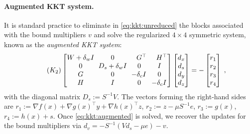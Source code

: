 \documentclass[smallextended]{svjour3}
\begin{document}
\paragraph{Augmented KKT system.}
It is standard practice to eliminate in \eqref{eq:kkt:unreduced} the blocks associated
with the bound multipliers $v$ and solve the regularized
$4 \times 4$ symmetric system, known as the \emph{augmented KKT system}:
\begin{equation}
  \label{eq:kkt:augmented}
  \tag{$K_2$}
  \setlength\arraycolsep{3pt}
  \begin{bmatrix}
    W + \delta_w I & 0   & \phantom{-}G^\top           & \phantom{-}H^\top           \\
      0       & D_s + \delta_w I  & \phantom{-}0\phantom{^\top} & \phantom{-}I\phantom{^\top} \\
      G       & 0   & -\delta_c I  & \phantom{-}0\phantom{^\top} \\
    H       & I   & \phantom{-}0\phantom{^\top} & -\delta_c I
  \end{bmatrix}
  \begin{bmatrix}
    d_x \\
    d_s \\
    d_y \\
    d_z
  \end{bmatrix}
  = - \begin{bmatrix}
    r_1 \\ r_2 \\ r_3 \\ r_4
  \end{bmatrix} \; ,
\end{equation}
with the diagonal matrix $D_s := S^{-1} V$.
The vectors forming the right-hand sides are
$r_1 := \nabla f(x) + \nabla g(x)^\top y + \nabla h(x)^\top z$,
$r_2 := z - \mu S^{-1} e$,
$r_3 := g(x)$,
$r_4 := h(x) + s$.
Once \eqref{eq:kkt:augmented} is solved, we recover the updates for the bound multipliers via
$d_v = - S^{-1}(V d_s - \mu e) - v$.
\end{document}
